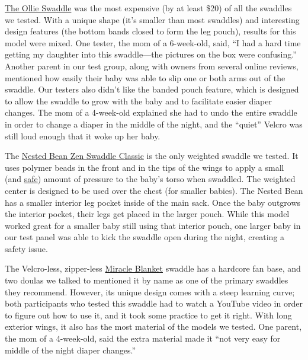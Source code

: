 \href{https://www.nytimes3xbfgragh.onion/wirecutter/out/link/30694/150985/4/86643/?merchant=Amazon}{The
Ollie Swaddle} was the most expensive (by at least \$20) of all the
swaddles we tested. With a unique shape (it's smaller than most
swaddles) and interesting design features (the bottom bands closed to
form the leg pouch), results for this model were mixed. One tester, the
mom of a 6-week-old, said, ``I had a hard time getting my daughter into
this swaddle---the pictures on the box were confusing.'' Another parent
in our test group, along with owners from several online reviews,
mentioned how easily their baby was able to slip one or both arms out of
the swaddle. Our testers also didn't like the banded pouch feature,
which is designed to allow the swaddle to grow with the baby and to
facilitate easier diaper changes. The mom of a 4-week-old explained she
had to undo the entire swaddle in order to change a diaper in the middle
of the night, and the ``quiet'' Velcro was still loud enough that it
woke up her baby.

The
\href{https://www.nytimes3xbfgragh.onion/wirecutter/out/link/30693/150984/4/86642/?merchant=Amazon}{Nested
Bean Zen Swaddle Classic} is the only weighted swaddle we tested. It
uses polymer beads in the front and in the tips of the wings to apply a
small (and \href{https://www.nestedbean.com/pages/faq}{safe}) amount of
pressure to the baby's torso when swaddled. The weighted center is
designed to be used over the chest (for smaller babies). The Nested Bean
has a smaller interior leg pocket inside of the main sack. Once the baby
outgrows the interior pocket, their legs get placed in the larger pouch.
While this model worked great for a smaller baby still using that
interior pouch, one larger baby in our test panel was able to kick the
swaddle open during the night, creating a safety issue.

The Velcro-less, zipper-less
\href{https://www.nytimes3xbfgragh.onion/wirecutter/out/link/30692/150983/4/86647/?merchant=Amazon}{Miracle
Blanket} swaddle has a hardcore fan base, and two doulas we talked to
mentioned it by name as one of the primary swaddles they recommend.
However, its unique design comes with a steep learning curve; both
participants who tested this swaddle had to watch a YouTube video in
order to figure out how to use it, and it took some practice to get it
right. With long exterior wings, it also has the most material of the
models we tested. One parent, the mom of a 4-week-old, said the extra
material made it ``not very easy for middle of the night diaper
changes.''

